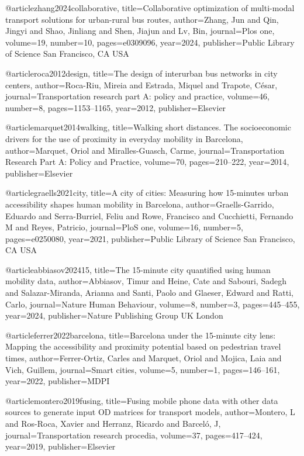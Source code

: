 @article{zhang2024collaborative,
  title={Collaborative optimization of multi-modal transport solutions for urban-rural bus routes},
  author={Zhang, Jun and Qin, Jingyi and Shao, Jinliang and Shen, Jiajun and Lv, Bin},
  journal={Plos one},
  volume={19},
  number={10},
  pages={e0309096},
  year={2024},
  publisher={Public Library of Science San Francisco, CA USA}
}

@article{roca2012design,
  title={The design of interurban bus networks in city centers},
  author={Roca-Riu, Mireia and Estrada, Miquel and Trapote, C{\'e}sar},
  journal={Transportation research part A: policy and practice},
  volume={46},
  number={8},
  pages={1153--1165},
  year={2012},
  publisher={Elsevier}
}


@article{marquet2014walking,
  title={Walking short distances. The socioeconomic drivers for the use of proximity in everyday mobility in Barcelona},
  author={Marquet, Oriol and Miralles-Guasch, Carme},
  journal={Transportation Research Part A: Policy and Practice},
  volume={70},
  pages={210--222},
  year={2014},
  publisher={Elsevier}
}


@article{graells2021city,
  title={A city of cities: Measuring how 15-minutes urban accessibility shapes human mobility in Barcelona},
  author={Graells-Garrido, Eduardo and Serra-Burriel, Feliu and Rowe, Francisco and Cucchietti, Fernando M and Reyes, Patricio},
  journal={PloS one},
  volume={16},
  number={5},
  pages={e0250080},
  year={2021},
  publisher={Public Library of Science San Francisco, CA USA}
}


@article{abbiasov202415,
  title={The 15-minute city quantified using human mobility data},
  author={Abbiasov, Timur and Heine, Cate and Sabouri, Sadegh and Salazar-Miranda, Arianna and Santi, Paolo and Glaeser, Edward and Ratti, Carlo},
  journal={Nature Human Behaviour},
  volume={8},
  number={3},
  pages={445--455},
  year={2024},
  publisher={Nature Publishing Group UK London}
}

@article{ferrer2022barcelona,
  title={Barcelona under the 15-minute city lens: Mapping the accessibility and proximity potential based on pedestrian travel times},
  author={Ferrer-Ortiz, Carles and Marquet, Oriol and Mojica, Laia and Vich, Guillem},
  journal={Smart cities},
  volume={5},
  number={1},
  pages={146--161},
  year={2022},
  publisher={MDPI}
}

@article{montero2019fusing,
  title={Fusing mobile phone data with other data sources to generate input OD matrices for transport models},
  author={Montero, L and Ros-Roca, Xavier and Herranz, Ricardo and Barcel{\'o}, J},
  journal={Transportation research procedia},
  volume={37},
  pages={417--424},
  year={2019},
  publisher={Elsevier}
}


